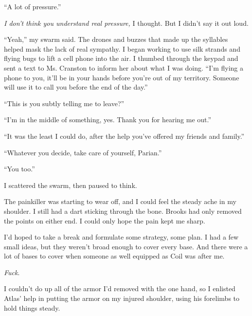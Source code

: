 ``A lot of pressure.''



\emph{I don't think you understand real pressure,} I thought.  But I didn't say it out loud.



``Yeah,'' my swarm said.  The drones and buzzes that made up the syllables helped mask the lack of real sympathy.  I began working to use silk strands and flying bugs to lift a cell phone into the air.  I thumbed through the keypad and sent a text to Ms. Cranston to inform her about what I was doing.  ``I'm flying a phone to you, it'll be in your hands before you're out of my territory.  Someone will use it to call you before the end of the day.''



``This is you subtly telling me to leave?''



``I'm in the middle of something, yes.  Thank you for hearing me out.''



``It was the least I could do, after the help you've offered my friends and family.''



``Whatever you decide, take care of yourself, Parian.''



``You too.''



I scattered the swarm, then paused to think.



The painkiller was starting to wear off, and I could feel the steady ache in my shoulder.  I still had a dart sticking through the bone.  Brooks had only removed the points on either end.  I could only hope the pain kept me sharp.



I'd hoped to take a break and formulate some strategy, some plan.  I had a few small ideas, but they weren't broad enough to cover every base.  And there were a lot of bases to cover when someone as well equipped as Coil was after me.



\emph{Fuck}.



I couldn't do up all of the armor I'd removed with the one hand, so I enlisted Atlas' help in putting the armor on my injured shoulder, using his forelimbs to hold things steady.



